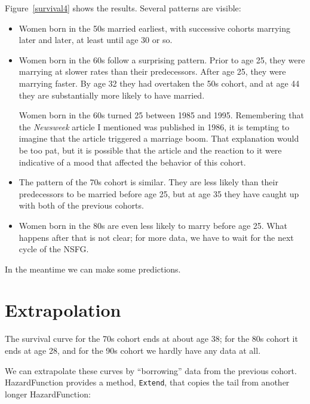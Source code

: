 \documentclass[12pt]{book}
\begin{document}
Figure~\ref{survival4} shows the results.  Several patterns are
visible:

\begin{itemize}

\item Women born in the 50s married earliest, with successive
  cohorts marrying later and later, at least until age 30 or so.

\item Women born in the 60s follow a surprising pattern.  Prior
to age 25, they were marrying at slower rates than their predecessors.
After age 25, they were marrying faster.  By age 32 they had overtaken
the 50s cohort, and at age 44 they are substantially more likely to
have married.

Women born in the 60s turned 25 between 1985 and 1995.  Remembering
that the {\it Newsweek\/} article I mentioned was published in 1986, it
is tempting to imagine that the article triggered a marriage boom.
That explanation would be too pat, but it is possible that the article
and the reaction to it were indicative of a mood that affected the
behavior of this cohort.

\item The pattern of the 70s cohort is similar.  They are less
likely than their predecessors to be married before age 25, but
at age 35 they have caught up with both of the previous cohorts.

\item Women born in the 80s are even less likely to marry before
age 25.  What happens after that is not clear; for more data, we
have to wait for the next cycle of the NSFG.

\end{itemize}

In the meantime we can make some predictions.


\section{Extrapolation}

The survival curve for the 70s cohort ends at about age 38;
for the 80s cohort it ends at age 28, and for the 90s cohort
we hardly have any data at all.

We can extrapolate these curves by ``borrowing'' data from the
previous cohort.  HazardFunction provides a method, \verb"Extend", that
copies the tail from another longer HazardFunction:
\end{document}
